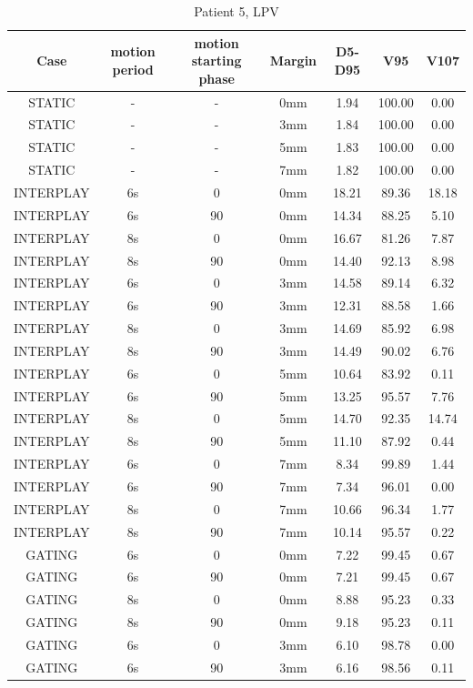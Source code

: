 \documentclass[type=dr, dr=rernat, accentcolor=tud7b,colorbacktitle, bigchapter, openright, twoside, 12pt ]{tudthesis}
\begin{document}
\begin{table}[H]
  \centering
  \caption{Patient 5, LPV}
  \begin{tabular}{|c||c|c|c||c|c|c|}
    \hline\hline
    Case & motion period & motion starting phase & Margin & D5-D95 & V95 & V107\\
    \hline  
STATIC & - & - & 0mm & 1.94 & 100.00 & 0.00 \\
STATIC & - & - & 3mm & 1.84 & 100.00 & 0.00 \\
STATIC & - & - & 5mm & 1.83 & 100.00 & 0.00 \\
STATIC & - & - & 7mm & 1.82 & 100.00 & 0.00 \\
INTERPLAY & 6s & 0 & 0mm & 18.21 & 89.36 & 18.18 \\
INTERPLAY & 6s & 90 & 0mm & 14.34 & 88.25 & 5.10 \\
INTERPLAY & 8s & 0 & 0mm & 16.67 & 81.26 & 7.87 \\
INTERPLAY & 8s & 90 & 0mm & 14.40 & 92.13 & 8.98 \\
INTERPLAY & 6s & 0 & 3mm & 14.58 & 89.14 & 6.32 \\
INTERPLAY & 6s & 90 & 3mm & 12.31 & 88.58 & 1.66 \\
INTERPLAY & 8s & 0 & 3mm & 14.69 & 85.92 & 6.98 \\
INTERPLAY & 8s & 90 & 3mm & 14.49 & 90.02 & 6.76 \\
INTERPLAY & 6s & 0 & 5mm & 10.64 & 83.92 & 0.11 \\
INTERPLAY & 6s & 90 & 5mm & 13.25 & 95.57 & 7.76 \\
INTERPLAY & 8s & 0 & 5mm & 14.70 & 92.35 & 14.74 \\
INTERPLAY & 8s & 90 & 5mm & 11.10 & 87.92 & 0.44 \\
INTERPLAY & 6s & 0 & 7mm & 8.34 & 99.89 & 1.44 \\
INTERPLAY & 6s & 90 & 7mm & 7.34 & 96.01 & 0.00 \\
INTERPLAY & 8s & 0 & 7mm & 10.66 & 96.34 & 1.77 \\
INTERPLAY & 8s & 90 & 7mm & 10.14 & 95.57 & 0.22 \\
GATING & 6s & 0 & 0mm & 7.22 & 99.45 & 0.67 \\
GATING & 6s & 90 & 0mm & 7.21 & 99.45 & 0.67 \\
GATING & 8s & 0 & 0mm & 8.88 & 95.23 & 0.33 \\
GATING & 8s & 90 & 0mm & 9.18 & 95.23 & 0.11 \\
GATING & 6s & 0 & 3mm & 6.10 & 98.78 & 0.00 \\
GATING & 6s & 90 & 3mm & 6.16 & 98.56 & 0.11 \\

\end{tabular}
\end{table}
\end{document}
